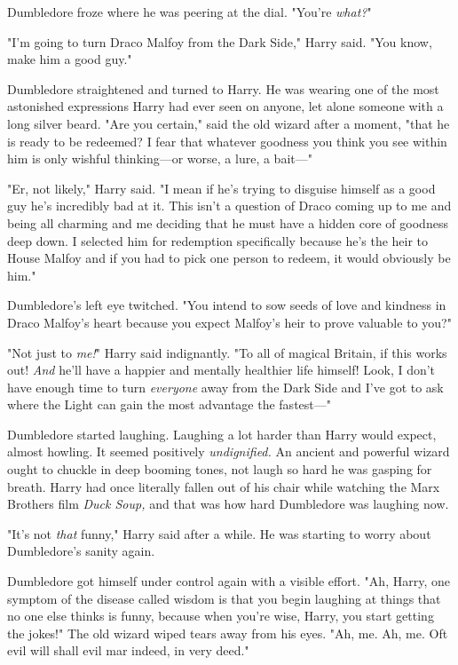 Dumbledore froze where he was peering at the dial. "You’re \emph{what?}"

"I’m going to turn Draco Malfoy from the Dark Side," Harry said. "You know,
make him a good guy."

Dumbledore straightened and turned to Harry. He was wearing one of the most
astonished expressions Harry had ever seen on anyone, let alone someone with a
long silver beard. "Are you certain," said the old wizard after a moment, "that
he is ready to be redeemed? I fear that whatever goodness you think you see
within him is only wishful thinking—or worse, a lure, a bait—"

"Er, not likely," Harry said. "I mean if he’s trying to disguise himself as a
good guy he’s incredibly bad at it. This isn’t a question of Draco coming up to
me and being all charming and me deciding that he must have a hidden core of
goodness deep down. I selected him for redemption specifically because he’s the
heir to House Malfoy and if you had to pick one person to redeem, it would
obviously be him."

Dumbledore’s left eye twitched. "You intend to sow seeds of love and kindness
in Draco Malfoy’s heart because you expect Malfoy’s heir to prove valuable to
you?"

"Not just to \emph{me!}" Harry said indignantly. "To all of magical Britain, if
this works out! \emph{And} he’ll have a happier and mentally healthier life
himself! Look, I don’t have enough time to turn \emph{everyone} away from the
Dark Side and I’ve got to ask where the Light can gain the most advantage the
fastest—"

Dumbledore started laughing. Laughing a lot harder than Harry would expect,
almost howling. It seemed positively \emph{undignified.} An ancient and
powerful wizard ought to chuckle in deep booming tones, not laugh so hard he
was gasping for breath. Harry had once literally fallen out of his chair while
watching the Marx Brothers film \emph{Duck Soup,} and that was how hard
Dumbledore was laughing now.

"It’s not \emph{that} funny," Harry said after a while. He was starting to
worry about Dumbledore’s sanity again.

Dumbledore got himself under control again with a visible effort. "Ah, Harry,
one symptom of the disease called wisdom is that you begin laughing at things
that no one else thinks is funny, because when you’re wise, Harry, you start
getting the jokes!" The old wizard wiped tears away from his eyes. "Ah, me. Ah,
me. Oft evil will shall evil mar indeed, in very deed."

